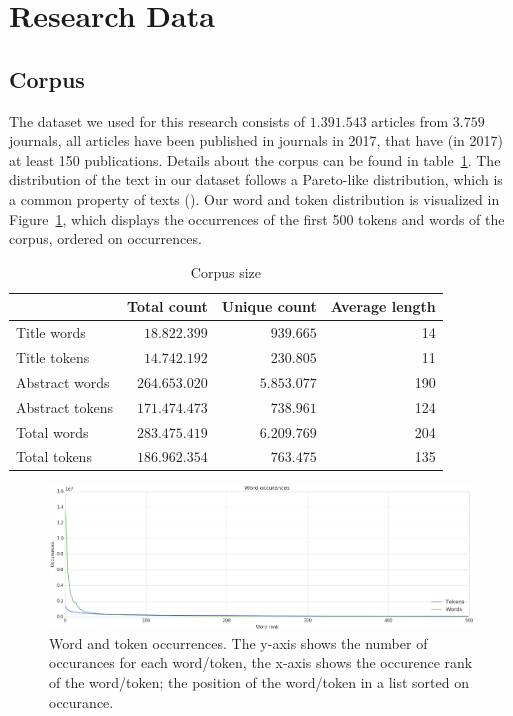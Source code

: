 \documentclass[../../paper.tex]{subfiles}
\begin{document}
\section{Research Data}
\subsection{Corpus}
The dataset we used for this research consists of $1.391.543$ articles from $3.759$ journals, all articles have been published in journals in 2017, that have (in 2017) at least 150 publications. Details about the corpus can be found in table~\ref{table:corpusSize}. The distribution of the text in our dataset follows a Pareto-like distribution, which is a common property of texts (\citet{wiegand2018word}). Our word and token distribution is visualized in Figure~\ref{figure:wordTokenOccurrence}, which displays the occurrences of the first 500 tokens and words of the corpus, ordered on occurrences.
\FloatBarrier
\begin{table}[hbt]
\begin{center}
\begin{tabular}{|l|r|r|r|}
\hline
 & Total count & Unique count & Average length\footnotemark \\
\hline\hline
Title words & $18.822.399$ & $939.665$ & 14  \\
\hline
Title tokens & $14.742.192$ & $230.805$ & 11 \\
\hline\hline
Abstract words & $264.653.020$ & $5.853.077$  & 190  \\
\hline
Abstract tokens & $171.474.473$ & $738.961$ & 124 \\
\hline\hline
Total words & $283.475.419$ & $6.209.769$  & 204 \\
\hline
Total tokens & $186.962.354$ & $763.475$ & 135 \\
\hline
\end{tabular}
\end{center}
\caption{Corpus size}\label{table:corpusSize}
\end{table}
\FloatBarrier
{}
\FloatBarrier
\begin{figure}[hbt]
\includegraphics[width=4.5in]{Plots/word_occurrences}
\caption{Word and token occurrences. The y-axis shows the number of occurances for each word/token, the x-axis shows the occurence rank of the word/token; the position of the word/token in a list sorted on occurance.}\label{figure:wordTokenOccurrence}
\end{figure}
\FloatBarrier
\end{document}
